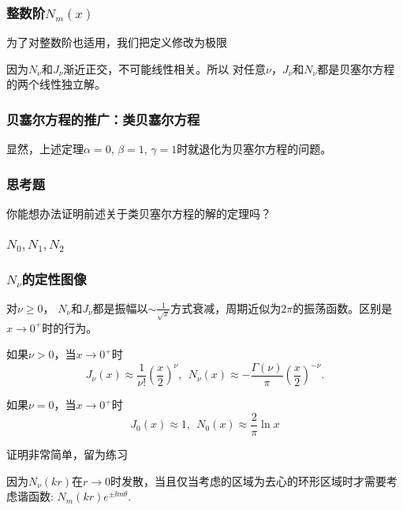 \documentclass[CJK]{beamer}
\begin{document}
\begin{frame}
\frametitle{整数阶$N_m(x)$}

为了对整数阶也适用，我们把定义修改为极限

\skiplines

因为$N_\nu$和$J_\nu$渐近正交，不可能线性相关。所以
{\blue
对任意$\nu $，$J_\nu$和$N_\nu$都是贝塞尔方程的两个线性独立解。}

\end{frame}


\begin{frame}
  \frametitle{贝塞尔方程的推广：类贝塞尔方程}

  显然，上述定理$\alpha=0$, $\beta = 1$, $\gamma=1$时就退化为贝塞尔方程的问题。
\end{frame}


\begin{frame}
  \frametitle{思考题}
  
  你能想办法证明前述关于类贝塞尔方程的解的定理吗？
\end{frame}


\begin{frame}
\frametitle{$N_0, N_1, N_2$}


\end{frame}


\begin{frame}
\frametitle{$N_\nu$的定性图像}

对$\nu\ge 0$， $N_\nu$和$J_\nu$都是振幅以$\sim \frac{1}{\sqrt{x}}$方式衰减，周期近似为$2\pi$的振荡函数。区别是$x\rightarrow 0^+$时的行为。

如果$\nu>0$，当$x\rightarrow 0^+$时
$$J_\nu(x)\approx \frac{1}{\nu !}\left(\frac{x}{2}\right)^\nu,\ \ N_\nu(x) \approx -\frac{\Gamma(\nu)}{\pi}\left(\frac{x}{2}\right)^{-\nu}. $$

\skiplines

如果$\nu = 0$，当$x\rightarrow 0^+$时
$$J_0(x)\approx 1 , \ \ N_0(x) \approx \frac{2}{\pi}\ln x $$

证明非常简单，留为练习

{\blue 因为$N_\nu(kr)$在$r\rightarrow 0$时发散，当且仅当考虑的区域为去心的环形区域时才需要考虑谐函数: $N_m(kr)e^{\pm \ii m\theta}$.}

\end{frame}
\end{document}
